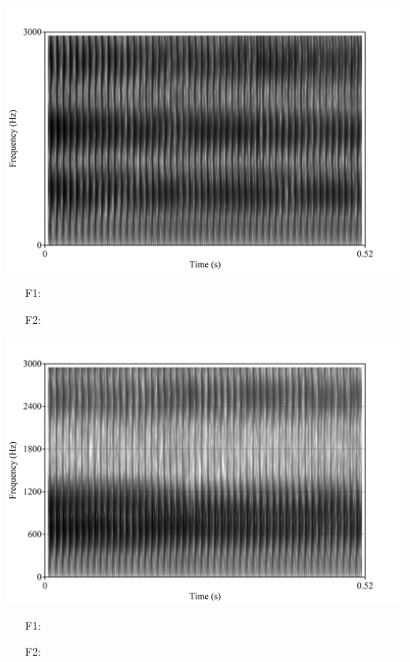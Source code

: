 \documentclass[addpoints]{exam}
\begin{document}
\begin{questions}
\begin{minipage}{0.45\linewidth}
          \includegraphics[scale=0.6]{vowel5.jpg}
        \end{minipage}\hspace{0.1\linewidth}
        \begin{minipage}{0.45\linewidth}
          \begin{itemize}
            \item[F1:] \hrulefill
            \item[F2:] \hrulefill
          \end{itemize}
        \end{minipage}
      \question[1]
        \begin{minipage}{0.45\linewidth}
          \includegraphics[scale=0.6]{vowel6.jpg}
        \end{minipage}\hspace{0.1\linewidth}
        \begin{minipage}{0.45\linewidth}
          \begin{itemize}
            \item[F1:] \hrulefill
            \item[F2:] \hrulefill
          \end{itemize}
        \end{minipage}
  \end{questions}

  \vspace{1.25cm}

  \begin{center}
    \gradetable[v][pages]
  \end{center}
\end{document}
